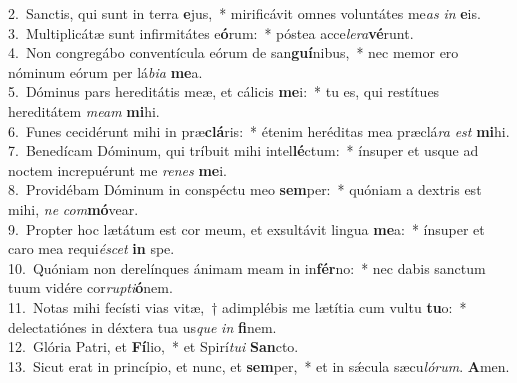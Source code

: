 {2.~}Sanctis, qui sunt in terra \textbf{e}jus,~* mirificávit omnes voluntátes me\textit{as} \textit{in} \textbf{e}is.\\
{3.~}Multiplicátæ sunt infirmitátes e\textbf{ó}rum:~* póstea acce\textit{le}\textit{ra}\textbf{vé}runt.\\
{4.~}Non congregábo conventícula eórum de san\textbf{guí}nibus,~* nec memor ero nóminum eórum per lá\textit{bi}\textit{a} \textbf{me}a.\\
{5.~}Dóminus pars hereditátis meæ, et cálicis \textbf{me}i:~* tu es, qui restítues hereditátem \textit{me}\textit{am} \textbf{mi}hi.\\
{6.~}Funes cecidérunt mihi in præ\textbf{clá}ris:~* étenim heréditas mea præclá\textit{ra} \textit{est} \textbf{mi}hi.\\
{7.~}Benedícam Dóminum, qui tríbuit mihi intel\textbf{lé}ctum:~* ínsuper et usque ad noctem increpuérunt me \textit{re}\textit{nes} \textbf{me}i.\\
{8.~}Providébam Dóminum in conspéctu meo \textbf{sem}per:~* quóniam a dextris est mihi, \textit{ne} \textit{com}\textbf{mó}vear.\\
{9.~}Propter hoc lætátum est cor meum, et exsultávit lingua \textbf{me}a:~* ínsuper et caro mea requi\textit{é}\textit{scet} \textbf{in} spe.\\
{10.~}Quóniam non derelínques ánimam meam in in\textbf{fér}no:~* nec dabis sanctum tuum vidére cor\textit{rup}\textit{ti}\textbf{ó}nem.\\
{11.~}Notas mihi fecísti vias vitæ,~† adimplébis me lætítia cum vultu \textbf{tu}o:~* delectatiónes in déxtera tua us\textit{que} \textit{in} \textbf{fi}nem.\\
{12.~}Glória Patri, et \textbf{Fí}lio,~* et Spirí\textit{tu}\textit{i} \textbf{San}cto.\\
{13.~}Sicut erat in princípio, et nunc, et \textbf{sem}per,~* et in sǽcula sæcu\textit{ló}\textit{rum}. \textbf{A}men.\\
